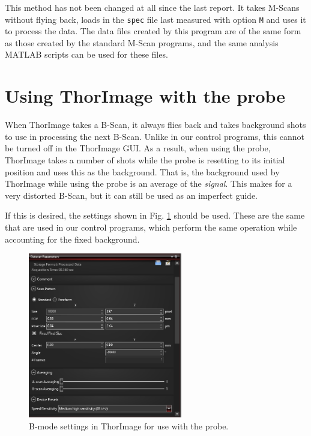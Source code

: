 \documentclass{article}
\begin{document}
\par{This method has not been changed at all since the last report. It takes M-Scans without flying back, loads in the \texttt{spec} file last measured with option \texttt{M} and uses it to process the data. The data files created by this program are of the same form as those created by the standard M-Scan programs, and the same analysis MATLAB scripts can be used for these files.}

\section{Using ThorImage with the probe}\label{thorimagesection}
\hypertarget{thorimagesection}{}

\par{When ThorImage takes a B-Scan, it always flies back and takes background shots to use in processing the next B-Scan. Unlike in our control programs, this cannot be turned off in the ThorImage GUI. As a result, when using the probe, ThorImage takes a number of shots while the probe is resetting to its initial position and uses this as the background. That is, the background used by ThorImage while using the probe is an average of the \textit{signal}. This makes for a very distorted B-Scan, but it can still be used as an imperfect guide.}

\par{If this is desired, the settings shown in Fig. \ref{tisettings} should be used. These are the same that are used in our control programs, which perform the same operation while accounting for the fixed background.}


\begin{figure}[!h]
	\centering
	\includegraphics[width=0.6\textwidth]{Data for Probe Writeup/ThorImage settings for BScan.png}
	\caption{B-mode settings in ThorImage for use with the probe.}\label{tisettings}
\end{figure}
\end{document}
